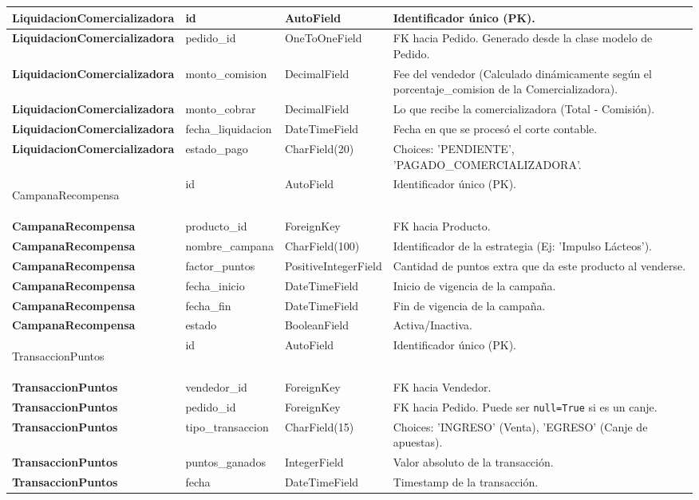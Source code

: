 \documentclass{article}
\begin{document}
\begin{longtable}{|>{\bfseries}p{3.2cm}|p{3.5cm}|p{2.8cm}|p{5.5cm}|}
Liquidacion\-Comerciali\-zadora & id & AutoField & Identificador único (PK). \\ \hline
Liquidacion\-Comerciali\-zadora & pedido\_id & OneToOneField & FK hacia Pedido. Generado desde la clase modelo de Pedido. \\ \hline
Liquidacion\-Comerciali\-zadora & monto\_comision & DecimalField & Fee del vendedor (Calculado dinámicamente según el porcentaje\_comision de la Comercializadora). \\ \hline
Liquidacion\-Comerciali\-zadora & monto\_cobrar & DecimalField & Lo que recibe la comercializadora (Total - Comisión). \\ \hline
Liquidacion\-Comerciali\-zadora & fecha\_liquidacion & DateTimeField & Fecha en que se procesó el corte contable. \\ \hline
Liquidacion\-Comerciali\-zadora & estado\_pago & CharField(20) & Choices: 'PENDIENTE', 'PAGADO\_COMERCIALIZADORA'. \\ \hline

Campana\-Recompensa & id & AutoField & Identificador único (PK). \\ \hline
Campana\-Recompensa & producto\_id & ForeignKey & FK hacia Producto. \\ \hline
Campana\-Recompensa & nombre\_campana & CharField(100) & Identificador de la estrategia (Ej: 'Impulso Lácteos'). \\ \hline
Campana\-Recompensa & factor\_puntos & Positive\-Integer\-Field & Cantidad de puntos extra que da este producto al venderse. \\ \hline
Campana\-Recompensa & fecha\_inicio & DateTimeField & Inicio de vigencia de la campaña. \\ \hline
Campana\-Recompensa & fecha\_fin & DateTimeField & Fin de vigencia de la campaña. \\ \hline
Campana\-Recompensa & estado & BooleanField & Activa/Inactiva. \\ \hline

Transaccion\-Puntos & id & AutoField & Identificador único (PK). \\ \hline
Transaccion\-Puntos & vendedor\_id & ForeignKey & FK hacia Vendedor. \\ \hline
Transaccion\-Puntos & pedido\_id & ForeignKey & FK hacia Pedido. Puede ser \texttt{null=True} si es un canje. \\ \hline
Transaccion\-Puntos & tipo\_transaccion & CharField(15) & Choices: 'INGRESO' (Venta), 'EGRESO' (Canje de apuestas). \\ \hline
Transaccion\-Puntos & puntos\_ganados & IntegerField & Valor absoluto de la transacción. \\ \hline
Transaccion\-Puntos & fecha & DateTimeField & Timestamp de la transacción. \\ \hline

\end{longtable}
\end{document}
